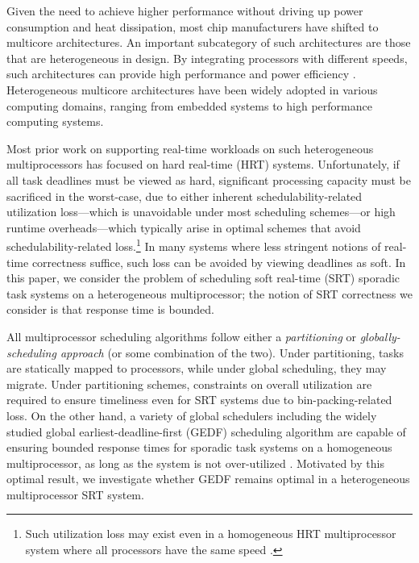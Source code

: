 \documentclass[Times, 10pt,twocolumn]{article}
\theoremstyle{definition}
\begin{document}
Given the need to achieve higher performance without driving up power consumption and heat dissipation, most chip manufacturers have shifted to multicore architectures. An important subcategory of such architectures are those that are heterogeneous in design. By integrating processors with different speeds, such architectures can provide high performance and power efficiency \cite{liu2012power}. Heterogeneous multicore architectures have been widely adopted in various computing domains, ranging from embedded systems to high performance computing systems. 

Most prior work on supporting real-time workloads on such heterogeneous multiprocessors has focused on hard real-time (HRT) systems. Unfortunately, if all task deadlines must be viewed as hard, significant processing capacity must be sacrificed in the worst-case, due to either inherent schedulability-related utilization loss---which is unavoidable under most scheduling schemes---or high runtime overheads---which typically arise in optimal schemes that avoid schedulability-related loss.\footnote{Such utilization loss may exist even in a homogeneous HRT multiprocessor system where all processors have the same speed \cite{baruah2007techniques, shin2012rtss, davis2011survey, bertogna2007response, davis2012optimal}.} In many systems where less stringent notions of real-time correctness suffice, such loss can be avoided by viewing deadlines as soft. In this paper, we consider the problem of scheduling soft real-time (SRT) sporadic task systems on a heterogeneous multiprocessor; the notion of SRT correctness we consider is that response time is bounded.



All multiprocessor scheduling algorithms follow either a \textit{partitioning} or \textit{globally-scheduling approach} (or some combination of the two). Under partitioning, tasks are statically mapped to processors, while under global scheduling, they may migrate. Under partitioning schemes, constraints on overall utilization are required to ensure timeliness even for SRT systems due to bin-packing-related loss. On the other hand, a variety of global schedulers including the widely studied global earliest-deadline-first (GEDF) scheduling algorithm are capable of ensuring bounded response times for sporadic task systems on a homogeneous multiprocessor, as long as the system is not over-utilized \cite{Devi}. Motivated by this optimal result, we investigate whether GEDF remains optimal in a heterogeneous multiprocessor SRT system.
\end{document}
